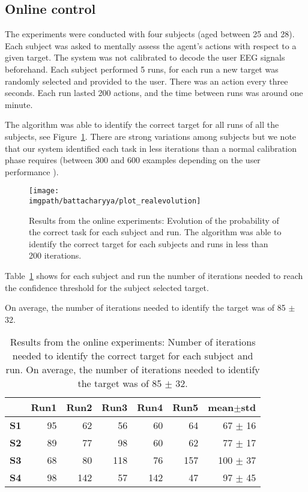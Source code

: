 \subsection{Online control}

The experiments were conducted with four subjects (aged between 25 and 28). Each subject was asked to mentally assess the agent's actions with respect to a given target. The system was not calibrated to decode the user EEG signals beforehand. Each subject performed 5 runs, for each run a new target was randomly selected and provided to the user. There was an action every three seconds. Each run lasted 200 actions, and the time between runs was around one minute.

The algorithm was able to identify the correct target for all runs of all the subjects, see Figure~\ref{fig:overlaponlineresults}. There are strong variations among subjects but we note that our system identified each task in less iterations than a normal calibration phase requires (between 300 and 600 examples depending on the user performance \cite{chavarriaga2010learning,iturrate2010single}).

\begin{figure}[!ht]
    \centering
    \texttt{[image: \\imgpath/battacharyya/plot\_realevolution]}    
    \caption{Results from the online experiments: Evolution of the probability of the correct task for each subject and run. The algorithm was able to identify the correct target for each subjects and runs in less than 200 iterations.}
    \label{fig:overlaponlineresults} 
\end{figure}

Table~\ref{tab:overlaponline} shows for each subject and run the number of iterations needed to reach the confidence threshold for the subject selected target.

On average, the number of iterations needed to identify the target was of 85 $\pm$ 32.

\begin{table}[!ht]
\centering
\begin{footnotesize}
\begin{tabular}{r|rrrrr|r}
    & \textbf{Run1} & \textbf{Run2} & \textbf{Run3} & \textbf{Run4} & \textbf{Run5} & \textbf{mean$\pm$std} \\\hline
    \textbf{S1} & 95 & 62 & 56 & 60 & 64 & 67 $\pm$ 16 \\
    \textbf{S2} & 89 & 77 & 98 & 60 & 62  & 77 $\pm$ 17 \\
    \textbf{S3} & 68 & 80 & 118 & 76 & 157 & 100 $\pm$ 37 \\
    \textbf{S4} & 98 & 142 & 57 & 142 & 47 & 97 $\pm$ 45 \\
\end{tabular}
\end{footnotesize}
  \caption{Results from the online experiments: Number of iterations needed to identify the correct target for each subject and run. On average, the number of iterations needed to identify the target was of 85 $\pm$ 32.}
  \label{tab:overlaponline}
\end{table}


